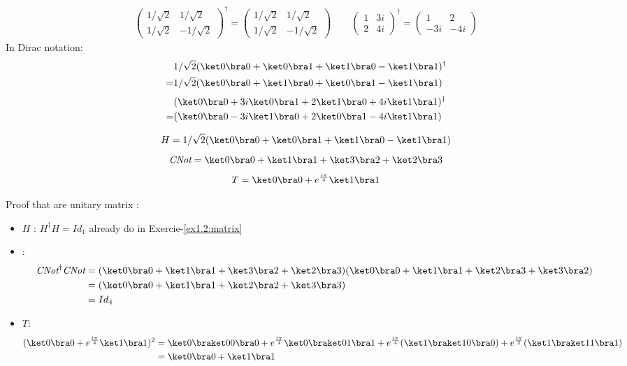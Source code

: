 
\begin{align*}
\left(\begin{array}{cc}
 1/\sqrt{2}& 1/\sqrt{2}\\
 1/\sqrt{2}& -1/\sqrt{2}
\end{array}\right)^\dagger
=
\left(\begin{array}{cc}
 1/\sqrt{2}& 1/\sqrt{2}\\
 1/\sqrt{2}& -1/\sqrt{2}
\end{array}\right)
\qquad
\left(\begin{array}{cc}
 1& 3i\\
 2& 4i
\end{array}\right)^\dagger
=
\left(\begin{array}{cc}
 1& 2\\
 -3i& -4i
\end{array}\right)
\end{align*}
In Dirac notation:
\begin{align*}
  &1/\sqrt 2 (\ket 0 \bra 0 + \ket 0 \bra 1 + \ket 1 \bra 0 - \ket 1 \bra
    1)^\dagger \\
  =&1/\sqrt 2 (\ket 0 \bra 0 + \ket 1 \bra 0 + \ket 0 \bra 1 - \ket 1 \bra 1)
\end{align*}
\begin{align*}
  &(\ket 0 \bra 0 + 3i \ket 0 \bra 1 + 2 \ket 1 \bra 0 + 4i \ket 1 \bra
    1)^\dagger \\
  =&(\ket 0 \bra 0 - 3i \ket 1 \bra 0 + 2 \ket 0 \bra 1 - 4i \ket 1 \bra
    1)
\end{align*}


$$ H = 1/\sqrt 2 (\ket 0 \bra 0+\ket 0 \bra 1+\ket 1 \bra 0-\ket 1 \bra 1)$$
$$ \textit{CNot} = \ket 0 \bra 0+\ket 1 \bra 1+\ket 3 \bra 2+\ket 2 \bra 3$$
$$ T = \ket 0 \bra 0 + e^{\frac{i\pi}{4}} \ket 1 \bra 1$$

Proof that are unitary matrix :

\begin{itemize}
  \item $H$ : $H^\dagger H = Id_1$ already do in Exercie-\ref{ex1.2:matrix}
  \item \CNot :
    \begin{align*}
      \CNot^\dagger \CNot &= 
        (\ket 0 \bra 0+\ket 1 \bra 1+\ket 3 \bra 2+\ket 2 \bra 3)
        (\ket 0 \bra 0+\ket 1 \bra 1+\ket 2 \bra 3+\ket 3 \bra 2) \\
        &=(\ket 0 \bra 0 + \ket 1 \bra 1 + \ket 2 \bra 2 + \ket 3 \bra 3) \\
        &= Id_4
    \end{align*}
  \item $T$:
    \begin{align*}
      (\ket 0 \bra 0 + e^{\frac{i\pi}{4}} \ket 1 \bra 1)^2
      &= \ket 0 \braket 0 0 \bra 0 + e^{\frac{i\pi}{4}} \ket 0 \braket 0 1 \bra 1
          + e^{\frac{i\pi}{4}}(\ket 1 \braket 1 0 \bra 0)
          + e^{\frac{i\pi}{2}}(\ket 1 \braket 1 1 \bra 1)\\
      &= \ket 0 \bra 0 + \ket 1 \bra 1
    \end{align*}
\end{itemize}

